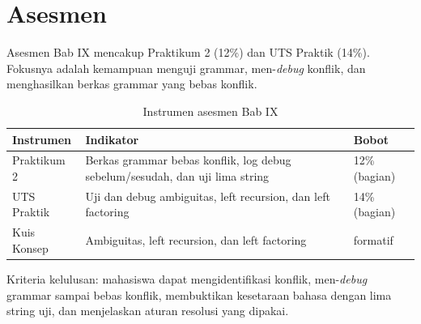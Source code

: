 \section*{Asesmen}

Asesmen Bab IX mencakup Praktikum 2 (12\%) dan UTS Praktik (14\%).
Fokusnya adalah kemampuan menguji grammar, men-\textit{debug} konflik,
dan menghasilkan berkas grammar yang bebas konflik.

\begin{table}[H]
\centering
\caption{Instrumen asesmen Bab IX}
\label{tab:ch09-asesmen}
\begin{tabularx}{\textwidth}{@{}lXl@{}}
\toprule
\textbf{Instrumen} & \textbf{Indikator} & \textbf{Bobot} \\
\midrule
Praktikum 2 & Berkas grammar bebas konflik, log debug sebelum/sesudah,
dan uji lima string & 12\% (bagian) \\
UTS Praktik & Uji dan debug ambiguitas, left recursion, dan left
factoring & 14\% (bagian) \\
Kuis Konsep & Ambiguitas, left recursion, dan left factoring &
formatif \\
\bottomrule
\end{tabularx}
\end{table}

Kriteria kelulusan: mahasiswa dapat mengidentifikasi konflik,
men-\textit{debug} grammar sampai bebas konflik, membuktikan kesetaraan
bahasa dengan lima string uji, dan menjelaskan aturan resolusi yang
dipakai.
